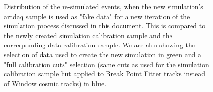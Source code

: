 \documentclass[12pt]{article}
\begin{document}
\begin{figure}[!ht]

\caption{Distribution of the re-simulated events, when the new simulation's artdaq sample is used as "fake data" for a new iteration of the simulation process discussed in this document. This is compared to the newly created simulation calibration sample and the corresponding data calibration sample. We are also showing the selection of data used to create the new simulation in green and a "full calibration cuts" selection (same cuts as used for the simulation calibration sample but applied to Break Point Fitter tracks instead of Window cosmic tracks) in blue.}
\label{figSimVersionComparison}
\end{figure}
\end{document}
